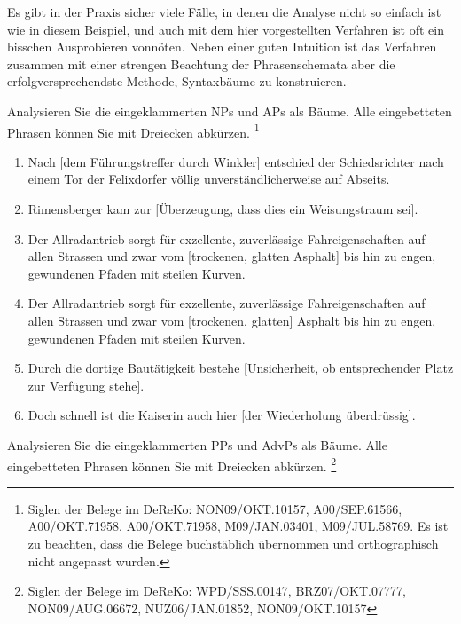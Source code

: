 Es gibt in der Praxis sicher viele Fälle, in denen die Analyse nicht so einfach ist wie in diesem Beispiel, und auch mit dem hier vorgestellten Verfahren ist oft ein bisschen Ausprobieren vonnöten.
Neben einer guten Intuition ist das Verfahren zusammen mit einer strengen Beachtung der Phrasenschemata aber die erfolgversprechendste Methode, Syntaxbäume zu konstruieren.

\Np


\Uebungen

\begin{sloppypar}

 \label{exc:phrasen01} Analysieren Sie die eingeklammerten NPs und APs als Bäume.
Alle eingebetteten Phrasen können Sie mit Dreiecken abkürzen.%
\footnote{Siglen der Belege im DeReKo: NON09\slash OKT.10157, A00\slash SEP.61566, A00\slash OKT.71958, A00\slash OKT.71958, M09\slash JAN.03401, M09\slash JUL.58769.
Es ist zu beachten, dass die Belege buchstäblich übernommen und orthographisch nicht angepasst wurden.}

\begin{enumerate}
  \item Nach [dem Führungstreffer durch Winkler] entschied der Schiedsrichter nach einem Tor der Felixdorfer völlig unverständlicherweise auf Abseits.
  \item Rimensberger kam zur [Überzeugung, dass dies ein Weisungstraum sei].
  \item Der Allradantrieb sorgt für exzellente, zuverlässige Fahreigenschaften auf allen Strassen und zwar vom [trockenen, glatten Asphalt] bis hin zu engen, gewundenen Pfaden mit steilen Kurven.
  \item Der Allradantrieb sorgt für exzellente, zuverlässige Fahreigenschaften auf allen Strassen und zwar vom [trockenen, glatten] Asphalt bis hin zu engen, gewundenen Pfaden mit steilen Kurven.
  \item Durch die dortige Bautätigkeit bestehe [Unsicherheit, ob entsprechender Platz zur Verfügung stehe].
  \item Doch schnell ist die Kaiserin auch hier [der Wiederholung überdrüssig].
\end{enumerate}

 \label{exc:phrasen02} Analysieren Sie die eingeklammerten PPs und AdvPs als Bäume.
Alle eingebetteten Phrasen können Sie mit Dreiecken abkürzen.%
\footnote{Siglen der Belege im DeReKo: WPD\slash SSS.00147, BRZ07\slash OKT.07777, NON09\slash AUG.06672, NUZ06\slash JAN.01852, NON09\slash OKT.10157}


\end{sloppypar}
